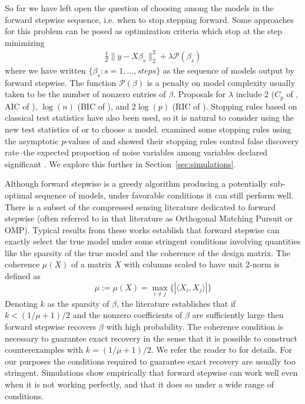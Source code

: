 \documentclass{imsart}
\newcommand{\innerp}[2]{\langle #1 , #2 \rangle}
\newcommand{\pen}{\mathcal{P}}
\begin{document}
So far we have left open the question of choosing among the models in
the forward stepwise sequence, i.e. when to stop stepping
forward. Some approaches for this problem can be posed as optimization
criteria which stop at the step minimizing
\begin{equation}
\begin{aligned}
\label{eq:subsetregress}
\frac{1}{2} \| y - X \beta_s \|_2^2 + \lambda \pen(\beta_s)
\end{aligned}
\end{equation}
where we have written $\{ \beta_s : s = 1, \ldots, steps \}$ as
the sequence of models output by forward stepwise. The function
$\pen(\beta)$ is a penalty on model complexity usually taken to be the
number of nonzero entries of $\beta$. Proposals for $\lambda$ include
2 ($C_p$ of \cite{CP}, AIC of \cite{AIC}), $\log(n)$ (BIC of \cite{BIC}), and
$2\log(p)$ (RIC of \cite{RIC}). Stopping rules based on classical test
statistics have also been used, so it is natural to consider using
the new test statistics of \cite{significance:lasso} or
\cite{tests:adaptive}
to choose a model. \cite{sequential:fdr} examined some stopping rules
using the asymptotic $p$-values of \cite{significance:lasso} and showed
their stopping rules control false discovery rate--the expected
proportion of noise variables among variables declared significant
\citep{fdr}. We explore this further in Section~\ref{sec:simulations}.

Although forward stepwise is a greedy algorithm producing a
potentially sub-optimal sequence of models, under favorable conditions
it can still perform well. There is a subset of the compressed sensing literature \citep{donoho:pursuit, cai:wang:omp} dedicated to forward stepwise (often referred to in that literature as Orthogonal Matching Pursuit or OMP). 
Typical results from these works establish that forward stepwise can exactly select the true model under some stringent conditions involving quantities like the sparsity of the true model and the coherence of the design matrix.
The coherence $\mu(X)$ of a matrix $X$ with columns scaled to have unit 2-norm is defined as
\begin{equation}
  \mu := \mu(X) = \max_{i \neq j} \{ | \innerp{ X_i }{ X_j } | \}
\end{equation}
Denoting $k$ as the sparsity of $\beta$, the literature establishes
that if $k < (1/\mu + 1)/2$ and the nonzero coefficients of $\beta$ are sufficiently large then forward stepwise recovers $\beta$ with high probability.
The coherence condition is necessary to guarantee exact recovery \citep{cai:wang:xu:sharp} in the sense that it is possible to construct counterexamples with $k = (1/\mu + 1)/2$.
We refer the reader to \cite{donoho:pursuit, cai:wang:omp} for details.
For our purposes the conditions required to guarantee exact recovery are usually too stringent.
Simulations show empirically that forward stepwise can work well even when it is not working perfectly, and that it does so under a wide range of conditions.
\end{document}

